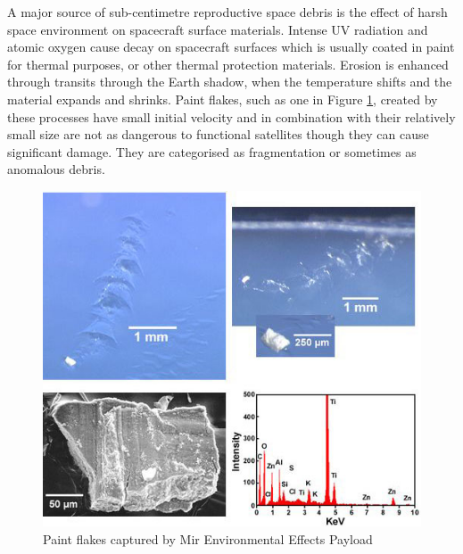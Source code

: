 	A major source of sub-centimetre reproductive space debris is the effect of harsh space environment on spacecraft surface materials. Intense UV radiation and atomic oxygen cause decay on spacecraft surfaces which is usually coated in paint for thermal purposes, or other thermal protection materials. Erosion is enhanced through transits through the Earth shadow, when the temperature shifts and the material expands and shrinks. Paint flakes, such as one in Figure \ref{fig:paintflakes}, created by these processes have small initial velocity and in combination with their relatively small size are not as dangerous to functional satellites though they can cause significant damage. They are categorised as fragmentation or sometimes as anomalous debris.
	
\begin{figure}[H]
  \includegraphics[width=\linewidth]{images/paintflakes}
  \caption{Paint flakes captured by Mir Environmental Effects Payload}
  \label{fig:paintflakes}
\end{figure}
	

